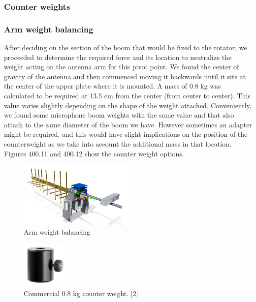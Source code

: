 \subsubsection{Counter weights}
\subsubsection*{Arm weight balancing}
After deciding on the section of the boom that would be fixed to the rotator, we proceeded to determine the required force and its location to neutralize the weight acting on the antenna arm for this pivot point. We found the center of gravity of the antenna and then commenced moving it backwards until it sits at the center of the upper plate where it is mounted. A mass of 0.8 kg was calculated to be required at 13.5 cm from the center (from center to center). This value varies slightly depending on the shape of the weight attached. Conveniently, we found some microphone boom weights with the same value and that also attach to the same diameter of the boom we have. However sometimes an adapter might be required, and this would have slight implications on the position of the counterweight as we take into account the additional mass in that location. Figures 400.11 and 400.12 show the counter weight options. 
\begin{figure}[H]
	\centering
	\includegraphics[width=0.5\textwidth]{../art/isoback.png}
	\caption{Arm weight balancing}
\end{figure}

\begin{figure}[H]
	\centering
	\includegraphics[width=0.2\textwidth]{../art/weight1.png}
	\caption{Commercial 0.8 kg counter weight. [2]}
\end{figure}





